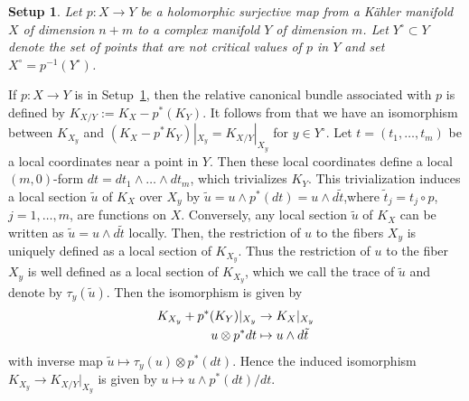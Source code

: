 \documentclass[a4paper, 11pt]{amsart}
\theoremstyle{plain}
\numberwithin{equation}{section} %
\numberwithin{figure}{section} %
\theoremstyle{plain}
\theoremstyle{plain}
\theoremstyle{plain}
\theoremstyle{plain}
\newtheorem{setup}[theorem]{Setup}
\theoremstyle{remark}
\theoremstyle{definition}
\theoremstyle{definition}
\begin{document}
{
\begin{setup}\label{setup: family}
Let $p:X \to Y$  be a holomorphic surjective map from a K\"ahler manifold $X$ of dimension $n+m$ to a complex manifold $Y$
of dimension $m$. Let $Y^\circ\subset Y$ denote the set of points that are not critical values of $p$ in $Y$ and set $X^\circ=p^{-1}(Y^\circ)$.  
\end{setup}

If $p:X\to Y$ is in Setup~\ref{setup: family}, then  the relative canonical bundle associated with $p $ is defined by $K_{X/Y}:= K_X-p^*(K_Y)$.  
It follows from \cite{Berndtsson09-curvature-fibrations, Berndtsson_Paun_08} that we have an isomorphism between $K_{X_y}$ and $(K_X-p^*K_{Y})^{}|_{X_y}= K_{X/Y}|_{X_y}$ {for $y\in Y^\circ$}.
Let $t=(t_1, \ldots,t_m)$ be a local coordinates near a point in $Y$. Then these local coordinates define a local $(m, 0)$-form $dt= dt_1\wedge\ldots \wedge dt_m$, which trivializes $K_Y$. This trivialization induces a local section $\tilde u$ of $K_X$ over $X_y$ by $\tilde u = u \wedge p^*(dt) = u \wedge d\tilde t$,where $\tilde t_j = t_j \circ p$, $j=1,\ldots,m$, are functions on $X$.
Conversely, any local section $\tilde u$ of $K_X$ can be written as $\tilde u = u \wedge d\tilde t$ locally. Then, the restriction of $u$ to the fibers $ X_y$ is uniquely defined as a local section of $K_{X_y}$. Thus the restriction of $u$ to the fiber $X_y$ is well defined as a local section of $K_{X_y}$, which we call the trace of $\tilde u$ and denote by $\tau_y(\tilde u)$.
Then the isomorphism is given by
\begin{equation}
\begin{split}
    K_{X_y}+ p^*(K_{Y})|_{X_y}& \rightarrow K_{X}|_{X_y} \\
    u\otimes p^* {\rm d}t &\mapsto u \wedge {\rm d}\tilde t  
\end{split}    
\end{equation}
with inverse map $\tilde u\mapsto \tau_y(u)\otimes p^*( dt)$. Hence the induced isomorphism  $K_{X_y}\to K_{X/Y}|_{X_y}$ is given by $u\mapsto u\wedge p^*(dt)/dt$.

}
\end{document}
